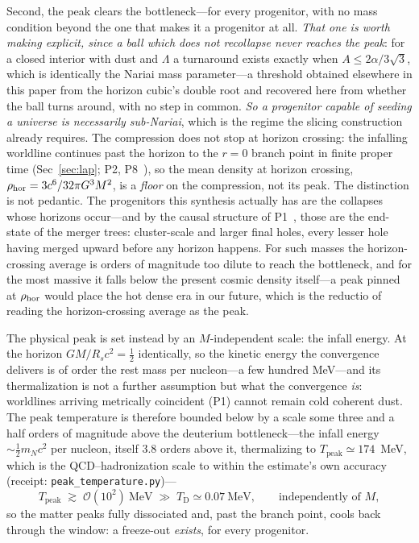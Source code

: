 \documentclass[11pt,a4paper]{article}
\theoremstyle{plain}
\theoremstyle{definition}
\theoremstyle{remark}
\newcommand{\TD}{T_{\mathrm{D}}}
\newcommand{\Tpk}{T_{\mathrm{peak}}}
\begin{document}
Second, the peak clears the bottleneck---for every progenitor, with no mass condition beyond the one that makes it a progenitor at all. \emph{That one is worth making explicit, since a ball which does not recollapse never reaches the peak}: for a closed interior with dust and $\Lambda$ a turnaround exists exactly when $A\le2\alpha/3\sqrt3$, which is identically the Nariai mass parameter---a threshold obtained elsewhere in this paper from the horizon cubic's double root and recovered here from whether the ball turns around, with no step in common. \emph{So a progenitor capable of seeding a universe is necessarily sub-Nariai}, which is the regime the slicing construction already requires.
The compression does not stop at horizon crossing: the infalling worldline continues past
the horizon to the $r=0$ branch point in finite proper time (Sec~\ref{sec:lap}; P2,
P8~\cite{JanzenCircle,JanzenOperator}), so the mean density at horizon crossing,
$\rho_{\rm hor}=3c^6/32\pi G^3M^2$, is a \emph{floor} on the compression, not its peak.
The distinction is not pedantic. The progenitors this synthesis actually has are the
collapses whose horizons occur---and by the causal structure of P1~\cite{JanzenBHcausality},
those are the end-state of the merger trees: cluster-scale and larger final holes, every
lesser hole having merged upward before any horizon happens. For such masses the
horizon-crossing average is orders of magnitude too dilute to reach the bottleneck, and for
the most massive it falls below the present cosmic density itself---a peak pinned at
$\rho_{\rm hor}$ would place the hot dense era in our future, which is the reductio of
reading the horizon-crossing average as the peak.

The physical peak is set instead by an $M$-independent scale: the infall energy. At the
horizon $GM/R_{s}c^{2}=\tfrac12$ identically, so the kinetic energy the convergence
delivers is of order the rest mass per nucleon---a few hundred MeV---and its
thermalization is not a further assumption but what the convergence \emph{is}: worldlines
arriving metrically coincident (P1) cannot remain cold coherent dust. The peak temperature
is therefore bounded below by a scale some three and a half orders of magnitude above the
deuterium bottleneck---the infall energy $\sim\tfrac12 m_N c^{2}$ per nucleon, itself $3.8$ orders
above it, thermalizing to $\Tpk\simeq174$~MeV, which is the QCD--hadronization scale to within the
estimate's own accuracy ~\cite{Borsanyi2016} (receipt: \texttt{peak\_temperature.py})---
\begin{equation}
\Tpk \;\gtrsim\; \mathcal{O}(10^{2})~\text{MeV} \;\gg\; \TD\simeq0.07~\text{MeV},
\qquad\text{independently of }M,
\end{equation}
so the matter peaks fully dissociated and, past the branch point, cools back through the window: a
freeze-out \emph{exists}, for every progenitor.
\end{document}
